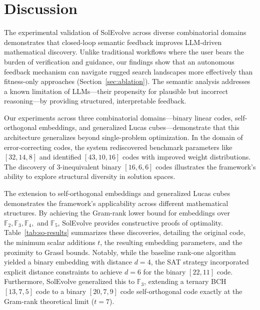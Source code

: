 \section{Discussion}\label{ch:discussion}

The experimental validation of SolEvolve across diverse combinatorial domains demonstrates that closed-loop semantic feedback improves LLM-driven mathematical discovery. Unlike traditional workflows where the user bears the burden of verification and guidance, our findings show that an autonomous feedback mechanism can navigate rugged search landscapes more effectively than fitness-only approaches (Section~\ref{sec:ablation}). The semantic analysis addresses a known limitation of LLMs---their propensity for plausible but incorrect reasoning---by providing structured, interpretable feedback.

Our experiments across three combinatorial domains---binary linear codes, self-orthogonal embeddings, and generalized Lucas cubes---demonstrate that this architecture generalizes beyond single-problem optimization. In the domain of error-correcting codes, the system rediscovered benchmark parameters like $[32,14,8]$ and identified $[43,10,16]$ codes with improved weight distributions. The discovery of 3-inequivalent binary $[16,6,6]$ codes illustrates the framework's ability to explore structural diversity in solution spaces.

The extension to self-orthogonal embeddings and generalized Lucas cubes demonstrates the framework's applicability across different mathematical structures. By achieving the Gram-rank lower bound for embeddings over $\mathbb{F}_2, \mathbb{F}_3, \mathbb{F}_4,$ and $\mathbb{F}_5$, SolEvolve provides constructive proofs of optimality. Table~\ref{tab:so-results} summarizes these discoveries, detailing the original code, the minimum scalar additions $t$, the resulting embedding parameters, and the proximity to Grassl bounds. Notably, while the baseline rank-one algorithm yielded a binary embedding with distance $d=4$, the SAT strategy incorporated explicit distance constraints to achieve $d=6$ for the binary $[22,11]$ code. Furthermore, SolEvolve generalized this to $\mathbb{F}_3$, extending a ternary BCH $[13,7,5]$ code to a binary $[20,7,9]$ code self-orthogonal code exactly at the Gram-rank theoretical limit ($t=7$).

